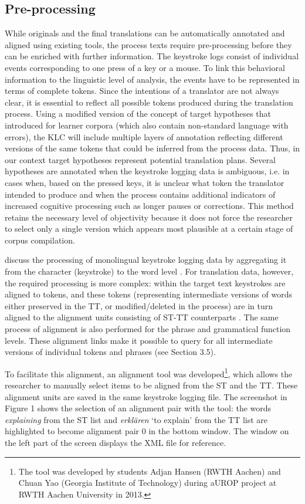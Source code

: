 \documentclass[output=paper]{LSP/langsci}
\begin{document}
\subsection{Pre-processing}
While originals and the final translations can be automatically annotated and aligned using existing tools, the process texts require pre-processing before they can be enriched with further information. The keystroke logs consist of individual events corresponding to one press of a key or a mouse. To link this behavioral information to the linguistic level of analysis, the events have to be represented in terms of complete tokens. Since the intentions of a translator are not always clear, it is essential to reflect all possible tokens produced during the translation process. Using a modified version of the concept of target hypotheses that \citet{Lüdeling2008} introduced for learner corpora (which also contain non-standard language with errors), the KLC will include multiple layers of annotation reflecting different versions of the same tokens that could be inferred from the process data. Thus, in our context target hypotheses represent potential translation plans. Several hypotheses are annotated when the keystroke logging data is ambiguous, i.e. in cases when, based on the pressed keys, it is unclear what token the translator intended to produce and when the process contains additional indicators of increased cognitive processing such as longer pauses or corrections. This method retains the necessary level of objectivity because it does not force the researcher to select only a single version which appears most plausible at a certain stage of corpus compilation.

\citet{Leijten2012} discuss the processing of monolingual keystroke logging data by aggregating it from the character (keystroke) to the word level \citep[see also][]{Macken2012}. For translation data, however, the required processing is more complex: within the target text keystrokes are aligned to tokens, and these tokens (representing intermediate versions of words either preserved in the TT, or modified/deleted in the process) are in turn aligned to the alignment units consisting of ST-TT counterparts \citep[see][227]{Carl2009a}. The same process of alignment is also performed for the phrase and grammatical function levels. These alignment links make it possible to query for all intermediate versions of individual tokens and phrases (see Section 3.5).

To facilitate this alignment, an alignment tool was developed\footnote{The tool was developed by students Adjan Hansen (RWTH Aachen) and Chuan Yao (Georgia Institute of Technology) during aUROP project at RWTH Aachen University in 2013.}, which allows the researcher to manually select items to be aligned from the ST and the TT. These alignment units are saved in the same keystroke logging file. The screenshot in Figure 1 shows the selection of an alignment pair with the tool: the words \textit{explaining }from the ST list and \textit{erklären} ‘to explain’ from the TT list are highlighted to become alignment pair 0 in the bottom window. The window on the left part of the screen displays the XML file for reference.
\end{document}
